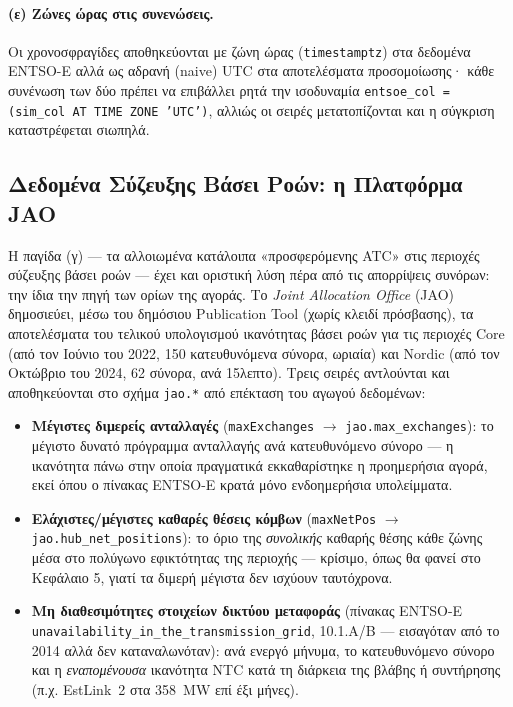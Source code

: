 \paragraph{(ε) Ζώνες ώρας στις συνενώσεις.}
\label{par:tz-joins}
Οι χρονοσφραγίδες αποθηκεύονται με ζώνη ώρας (\texttt{timestamptz}) στα δεδομένα ENTSO-E αλλά ως αδρανή (naive) UTC στα αποτελέσματα προσομοίωσης· κάθε συνένωση των δύο πρέπει να επιβάλλει ρητά την ισοδυναμία \texttt{entsoe\_col = (sim\_col AT TIME ZONE 'UTC')}, αλλιώς οι σειρές μετατοπίζονται και η σύγκριση καταστρέφεται σιωπηλά.

\subsection{Δεδομένα Σύζευξης Βάσει Ροών: η Πλατφόρμα JAO}
\label{subsec:jao-data}

Η παγίδα (γ) --- τα αλλοιωμένα κατάλοιπα «προσφερόμενης ATC» στις περιοχές σύζευξης βάσει ροών --- έχει και οριστική λύση πέρα από τις απορρίψεις συνόρων: την ίδια την πηγή των ορίων της αγοράς. Το \emph{Joint Allocation Office} (JAO) δημοσιεύει, μέσω του δημόσιου Publication Tool (χωρίς κλειδί πρόσβασης), τα αποτελέσματα του τελικού υπολογισμού ικανότητας βάσει ροών για τις περιοχές Core (από τον Ιούνιο του 2022, 150 κατευθυνόμενα σύνορα, ωριαία) και Nordic (από τον Οκτώβριο του 2024, 62 σύνορα, ανά 15λεπτο). Τρεις σειρές αντλούνται και αποθηκεύονται στο σχήμα \texttt{jao.*} από επέκταση του αγωγού δεδομένων:

\begin{itemize}
\item \textbf{Μέγιστες διμερείς ανταλλαγές} (\texttt{maxExchanges} $\to$ \texttt{jao.max\_exchanges}): το μέγιστο δυνατό πρόγραμμα ανταλλαγής ανά κατευθυνόμενο σύνορο --- η ικανότητα πάνω στην οποία πραγματικά εκκαθαρίστηκε η προημερήσια αγορά, εκεί όπου ο πίνακας ENTSO-E κρατά μόνο ενδοημερήσια υπολείμματα.
\item \textbf{Ελάχιστες/μέγιστες καθαρές θέσεις κόμβων} (\texttt{maxNetPos} $\to$ \texttt{jao.hub\_net\_positions}): το όριο της \emph{συνολικής} καθαρής θέσης κάθε ζώνης μέσα στο πολύγωνο εφικτότητας της περιοχής --- κρίσιμο, όπως θα φανεί στο Κεφάλαιο 5, γιατί τα διμερή μέγιστα δεν ισχύουν ταυτόχρονα.
\item \textbf{Μη διαθεσιμότητες στοιχείων δικτύου μεταφοράς} (πίνακας ENTSO-E \texttt{unavailability\_in\_the\_transmission\_grid}, 10.1.A/B --- εισαγόταν από το 2014 αλλά δεν καταναλωνόταν): ανά ενεργό μήνυμα, το κατευθυνόμενο σύνορο και η \emph{εναπομένουσα} ικανότητα NTC κατά τη διάρκεια της βλάβης ή συντήρησης (π.χ. EstLink~2 στα 358~MW επί έξι μήνες).
\end{itemize}

